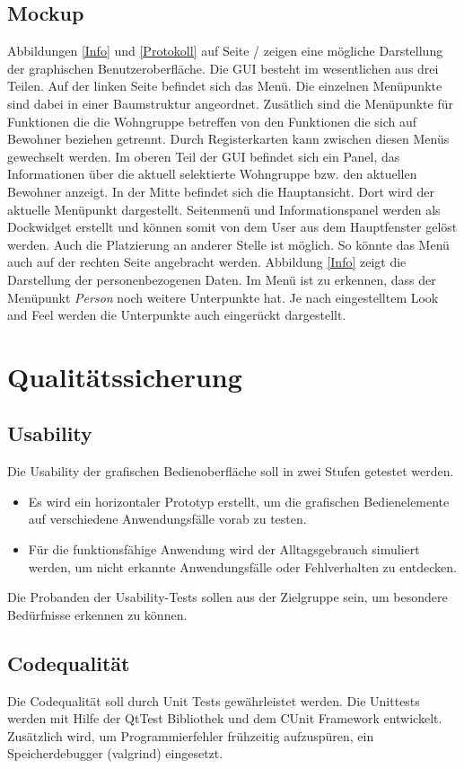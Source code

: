 \documentclass[a4paper,10pt]{article}
\begin{document}
\subsection{Mockup}
Abbildungen \ref{Info} und \ref{Protokoll} auf Seite \pageref{Info} / \pageref{Protokoll}  zeigen eine mögliche Darstellung der graphischen Benutzeroberfläche. 
Die GUI besteht im wesentlichen aus drei Teilen. Auf der linken Seite befindet sich das Menü. Die einzelnen Menüpunkte sind dabei in einer Baumstruktur angeordnet. 
Zusätlich sind die Menüpunkte für Funktionen die die Wohngruppe betreffen von den Funktionen die sich auf Bewohner beziehen getrennt. 
Durch Registerkarten kann zwischen diesen Menüs gewechselt werden. Im oberen Teil der GUI befindet sich ein Panel, das Informationen über die aktuell selektierte Wohngruppe bzw. den aktuellen Bewohner anzeigt. 
In der Mitte befindet sich die Hauptansicht. Dort wird der aktuelle Menüpunkt dargestellt. Seitenmenü und Informationspanel werden als Dockwidget erstellt und können 
somit von dem User aus dem Hauptfenster gelöst werden. Auch die Platzierung an anderer Stelle ist möglich. So könnte das Menü auch auf der rechten Seite angebracht werden.
\newline
Abbildung \ref{Info} zeigt die Darstellung der personenbezogenen Daten. Im Menü ist zu erkennen, dass der Menüpunkt \emph{Person} noch weitere Unterpunkte hat. 
Je nach eingestelltem Look and Feel werden die Unterpunkte auch eingerückt dargestellt.

\section{Qualitätssicherung}
\subsection{Usability}
Die Usability der grafischen Bedienoberfläche soll in zwei Stufen getestet werden.
\begin{itemize}
	\item Es wird ein horizontaler Prototyp erstellt,  um die grafischen Bedienelemente auf verschiedene Anwendungsfälle vorab zu testen. 
	\item Für die funktionsfähige Anwendung wird der Alltagsgebrauch simuliert werden, um nicht erkannte Anwendungsfälle oder Fehlverhalten zu entdecken.
\end{itemize}
Die Probanden der Usability-Tests sollen aus der Zielgruppe sein, um besondere Bedürfnisse erkennen zu können.    
\subsection{Codequalität}
Die Codequalität soll durch Unit Tests gewährleistet werden.
Die Unittests werden mit Hilfe der QtTest Bibliothek und dem CUnit Framework entwickelt.
Zusätzlich wird, um Programmierfehler frühzeitig aufzuspüren, ein Speicherdebugger (valgrind) eingesetzt.
\end{document}
